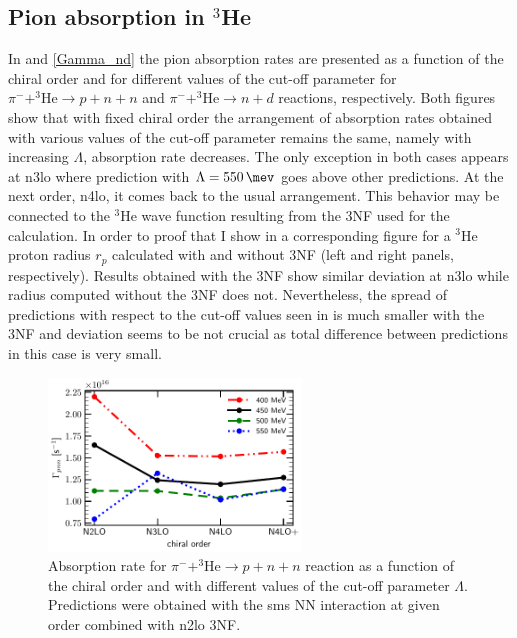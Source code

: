     \subsection{Pion absorption in $^3$He}
    
    In  and \ref{Gamma_nd} the pion absorption rates are presented as a function
    of the chiral order and for different values of the cut-off parameter
    for $\pi^- + ^3\text{He} \rightarrow p + n + n$ 
    and $\pi^- + ^3\text{He} \rightarrow n + d$ reactions, respectively.
    Both figures show that with fixed chiral order the arrangement 
    of absorption rates obtained with various values of the cut-off parameter
    remains the same, namely with increasing $\Lambda$, absorption rate decreases. The only exception in both cases 
    appears at \gls{n3lo} where prediction with $\Lambda = \SI{550}{\mev}$ goes above other predictions.
    At the next order, \gls{n4lo}, it comes back to the usual arrangement.
    This behavior may be connected to the $^3$He wave function resulting from the
    3NF used for the calculation.
    In order to proof that I show in 
    a corresponding figure for a $^3$He proton radius $r_p$ calculated with 
    and without 3NF (left and right panels, respectively). Results obtained with the 3NF show
    similar deviation at \gls{n3lo} while radius computed without the 3NF does not.
    Nevertheless, the spread of predictions with respect to
    the cut-off values seen in  is much smaller
    with the 3NF and deviation seems to be not crucial as total difference
    between predictions in this case is very small.




    \begin{figure}[h]
        \begin{center}
        \includegraphics[width=0.6\textwidth]{PlotData/PION/Dalitz_maps/figures/Gamma_pnn.pdf}
        \end{center}
        \caption{Absorption rate for $\pi^- + ^3\text{He} \rightarrow p + n + n$ reaction as a function
        of the chiral order and with different values of the cut-off parameter $\Lambda$.
        Predictions were obtained with the \gls{sms} NN interaction at given order combined
        with \gls{n2lo} 3NF.}
        \label{Gamma_pnn}
    \end{figure}


